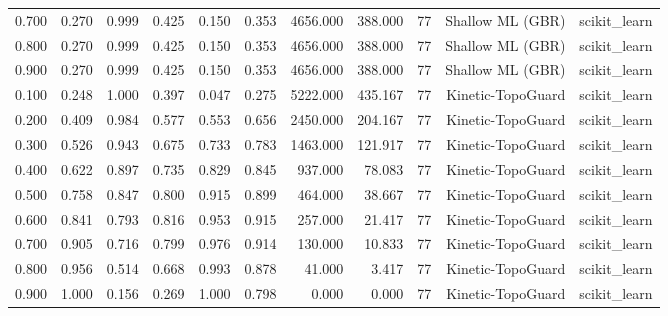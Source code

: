 \begin{tabular}{lrrrrrrrrrr}
0.700 & 0.270 & 0.999 & 0.425 & 0.150 & 0.353 & 4656.000 & 388.000 & 77 & Shallow ML (GBR) & scikit\_learn \\
0.800 & 0.270 & 0.999 & 0.425 & 0.150 & 0.353 & 4656.000 & 388.000 & 77 & Shallow ML (GBR) & scikit\_learn \\
0.900 & 0.270 & 0.999 & 0.425 & 0.150 & 0.353 & 4656.000 & 388.000 & 77 & Shallow ML (GBR) & scikit\_learn \\
0.100 & 0.248 & 1.000 & 0.397 & 0.047 & 0.275 & 5222.000 & 435.167 & 77 & Kinetic-TopoGuard & scikit\_learn \\
0.200 & 0.409 & 0.984 & 0.577 & 0.553 & 0.656 & 2450.000 & 204.167 & 77 & Kinetic-TopoGuard & scikit\_learn \\
0.300 & 0.526 & 0.943 & 0.675 & 0.733 & 0.783 & 1463.000 & 121.917 & 77 & Kinetic-TopoGuard & scikit\_learn \\
0.400 & 0.622 & 0.897 & 0.735 & 0.829 & 0.845 & 937.000 & 78.083 & 77 & Kinetic-TopoGuard & scikit\_learn \\
0.500 & 0.758 & 0.847 & 0.800 & 0.915 & 0.899 & 464.000 & 38.667 & 77 & Kinetic-TopoGuard & scikit\_learn \\
0.600 & 0.841 & 0.793 & 0.816 & 0.953 & 0.915 & 257.000 & 21.417 & 77 & Kinetic-TopoGuard & scikit\_learn \\
0.700 & 0.905 & 0.716 & 0.799 & 0.976 & 0.914 & 130.000 & 10.833 & 77 & Kinetic-TopoGuard & scikit\_learn \\
0.800 & 0.956 & 0.514 & 0.668 & 0.993 & 0.878 & 41.000 & 3.417 & 77 & Kinetic-TopoGuard & scikit\_learn \\
0.900 & 1.000 & 0.156 & 0.269 & 1.000 & 0.798 & 0.000 & 0.000 & 77 & Kinetic-TopoGuard & scikit\_learn \\
\bottomrule
\end{tabular}